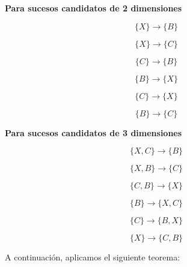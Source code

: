 \documentclass [a4paper] {article}
\begin{document}
\hfil \textbf{Para sucesos candidatos de 2 dimensiones} \par
\hfil \begin{equation*} \{X\} \rightarrow \{B\} \end{equation*} \par
\hfil \begin{equation*} \{X\} \rightarrow \{C\} \end{equation*} \par
\hfil \begin{equation*} \{C\} \rightarrow \{B\} \end{equation*} \par
\hfil \begin{equation*} \{B\} \rightarrow \{X\} \end{equation*} \par
\hfil \begin{equation*} \{C\} \rightarrow \{X\} \end{equation*} \par
\hfil \begin{equation*} \{B\} \rightarrow \{C\} \end{equation*} \par
\newpage
\hfil \textbf{Para sucesos candidatos de 3 dimensiones} \par
\hfil \begin{equation*} \{X,C\} \rightarrow \{B\} \end{equation*} \par
\hfil \begin{equation*} \{X,B\} \rightarrow \{C\} \end{equation*} \par
\hfil \begin{equation*} \{C,B\} \rightarrow \{X\} \end{equation*} \par
\hfil \begin{equation*} \{B\} \rightarrow \{X,C\} \end{equation*} \par
\hfil \begin{equation*} \{C\} \rightarrow \{B,X\} \end{equation*} \par
\hfil \begin{equation*} \{X\} \rightarrow \{C,B\} \end{equation*} \par

A continuación, aplicamos el siguiente teorema:
\end{document}
